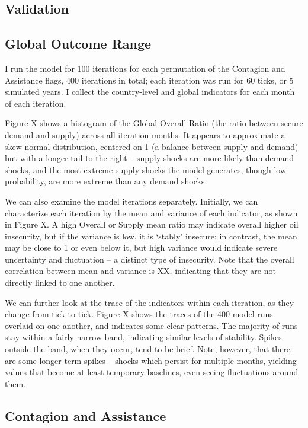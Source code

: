 \documentclass{article}
\begin{document}
\subsection{Validation}

\subsection{Global Outcome Range}

I run the model for 100 iterations for each permutation of the Contagion and Assistance flags, 400 iterations in total; each iteration was run for 60 ticks, or 5 simulated years. I collect the country-level and global indicators for each month of each iteration. 

Figure X shows a histogram of the Global Overall Ratio (the ratio between secure demand and supply) across all iteration-months. It appears to approximate a skew normal distribution, centered on 1 (a balance between supply and demand) but with a longer tail to the right -- supply shocks are more likely than demand shocks, and the most extreme supply shocks the model generates, though low-probability, are more extreme than any demand shocks. 

We can also examine the model iterations separately. Initially, we can characterize each iteration by the mean and variance of each indicator, as shown in Figure X. A high Overall or Supply mean ratio may indicate overall higher oil insecurity, but if the variance is low, it is `stably' insecure; in contrast, the mean may be close to 1 or even below it, but high variance would indicate severe uncertainty and fluctuation -- a distinct type of insecurity. Note that the overall correlation between mean and variance is XX, indicating that they are not directly linked to one another.

We can further look at the trace of the indicators within each iteration, as they change from tick to tick. Figure X shows the traces of the 400 model runs overlaid on one another, and indicates some clear patterns. The majority of runs stay within a fairly narrow band, indicating similar levels of stability. Spikes outside the band, when they occur, tend to be brief. Note, however, that there are some longer-term spikes -- shocks which persist for multiple months, yielding values that become at least temporary baselines, even seeing fluctuations around them.

\subsection{Contagion and Assistance}
\end{document}
